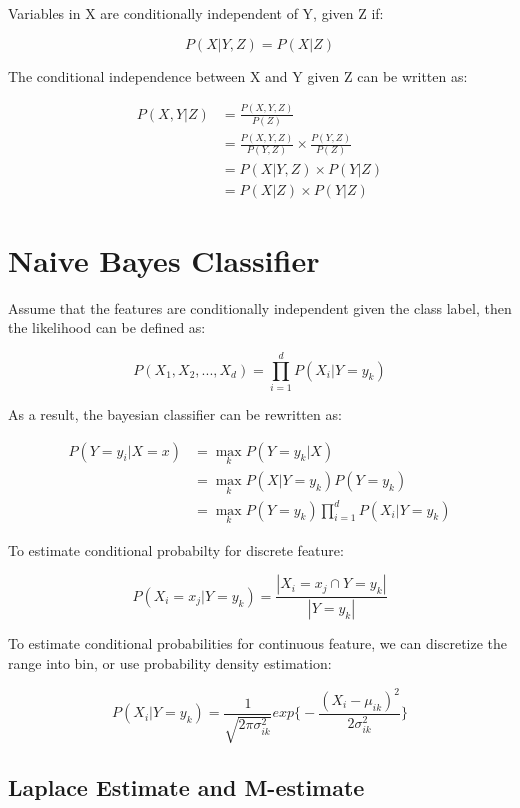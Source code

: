 \begin{multicols*}{2}
\noindent Variables in X are conditionally independent of Y, given Z if:

$$P(X|Y,Z) = P(X|Z)$$ 

\noindent The conditional independence between X and Y given Z can be written as:

\begin{equation*}
\begin{split}
    P(X,Y|Z) &= \frac{P(X,Y,Z)}{P(Z)}\\
    &= \frac{P(X,Y,Z)}{P(Y,Z)}\times \frac{P(Y,Z)}{P(Z)} \\
    &= P(X|Y,Z) \times P(Y|Z) \\
    &= P(X|Z) \times P(Y|Z)
\end{split}
\end{equation*}

\section{Naive Bayes Classifier}

\noindent Assume that the features are conditionally independent given the class label, then the likelihood can be defined as:

$$P(X_1, X_2, ..., X_d) = \prod_{i=1}^{d} P(X_{i}|Y = y_{k})$$

\noindent As a result, the bayesian classifier can be rewritten as:

\begin{equation*}
\begin{split}
    P(Y=y_{i}|X=x) &= \!\max_{k} P(Y=y_{k}|X) \\
    &= \!\max_{k} P(X | Y = y_k) P(Y= y_k) \\
    &= \!\max_{k} P(Y=y_k) \prod_{i=1}^{d} P(X_{i}|Y = y_{k})
\end{split}
\end{equation*}

\noindent To estimate conditional probabilty for discrete feature:

$$P(X_i=x_j|Y=y_k) = \frac{|X_i = x_j \cap Y=y_k|}{|Y=y_k|}$$

\noindent To estimate conditional probabilities for continuous feature, we can discretize the range into bin, or use probability density estimation:

$$P(X_{i}| Y=y_{k}) = \frac{1}{\sqrt{2 \pi \sigma^{2}_{ik}}} exp \bigg\{ - \frac{(X_{i} - \mu_{ik})^{2} }{2 \sigma^{2}_{ik}} \bigg\}$$

\subsection{Laplace Estimate and M-estimate}


\end{multicols*}
